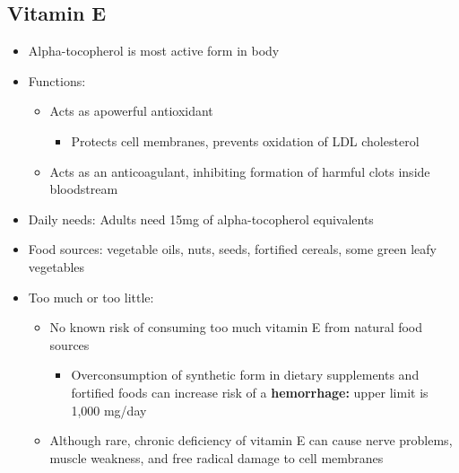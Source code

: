 \documentclass[12pt]{article}
\begin{document}
        \subsection{Vitamin E}
            \begin{itemize}
                \item Alpha-tocopherol is most active form in body
                \item Functions:
                    \begin{itemize}
                        \item Acts as apowerful antioxidant
                            \begin{itemize}
                                \item Protects cell membranes, prevents oxidation of LDL cholesterol
                            \end{itemize}
                        \item Acts as an anticoagulant, inhibiting formation of harmful clots inside bloodstream
                    \end{itemize}
                \item Daily needs: Adults need 15mg of alpha-tocopherol equivalents
                \item Food sources: vegetable oils, nuts, seeds, fortified cereals, some green leafy vegetables
                \item Too much or too little:
                    \begin{itemize}
                        \item No known risk of consuming too much vitamin E from natural food sources
                            \begin{itemize}
                                \item Overconsumption of synthetic form in dietary supplements and fortified foods can increase risk of a \textbf{hemorrhage:} upper limit is 1,000 mg/day
                            \end{itemize}
                        \item Although rare, chronic deficiency of vitamin E can cause nerve problems, muscle weakness, and free radical damage to cell membranes
                    \end{itemize}
            \end{itemize}
\end{document}

